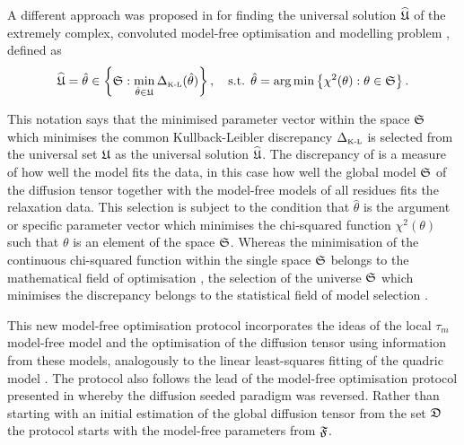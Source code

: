 \begin{htmlonly}
\begin{htmlonly}
A different approach was proposed in \citet{dAuvergneGooley08b} for finding the universal solution $\widehat{\mathfrak{U}}$ of the extremely complex, convoluted model-free optimisation and modelling problem \citep{dAuvergneGooley07}, defined as
\begin{equation} \label{eq: universal solution}
 \widehat{\mathfrak{U}} = \hat\theta \in \left\{ \mathfrak{S}: \min_{\hat\theta \in \mathfrak{U}} \Delta_{\scriptscriptstyle \text{K-L}}(\hat\theta) \right\},
  \text{\quad s.t. }
  \hat\theta = \arg \min \left\{\chi^2(\theta): \theta \in \mathfrak{S} \right\}.
\end{equation}

\noindent This notation says that the minimised parameter vector within the space $\mathfrak{S}$ which minimises the common Kullback-Leibler discrepancy $\Delta_{\scriptscriptstyle \text{K-L}}$ is selected from the universal set $\mathfrak{U}$ as the universal solution $\widehat{\mathfrak{U}}$.  The discrepancy of \citet{KullbackLeibler51} is a measure of how well the model fits the data, in this case how well the global model $\mathfrak{S}$ of the diffusion tensor together with the model-free models of all residues fits the relaxation data.  This selection is subject to the condition that $\hat\theta$ is the argument or specific parameter vector which minimises the chi-squared function $\chi^2(\theta)$ such that $\theta$ is an element of the space $\mathfrak{S}$.  Whereas the minimisation of the continuous chi-squared function within the single space $\mathfrak{S}$ belongs to the mathematical field of optimisation \citep{NocedalWright99}, the selection of the universe $\mathfrak{S}$ which minimises the discrepancy belongs to the statistical field of model selection \citep{Akaike73,Schwarz78,LinhartZucchini86,Zucchini00,dAuvergneGooley03}.

This new model-free optimisation protocol incorporates the ideas of the local $\tau_m$ model-free model \citep{Barbato92, Schurr94} and the optimisation of the diffusion tensor using information from these models, analogously to the linear least-squares fitting of the quadric model \citep{Bruschweiler95, Lee97}.  The protocol also follows the lead of the model-free optimisation protocol presented in \citet{Butterwick04} whereby the diffusion seeded paradigm was reversed.  Rather than starting with an initial estimation of the global diffusion tensor from the set $\mathfrak{D}$ the protocol starts with the model-free parameters from $\mathfrak{F}$.


\end{htmlonly}
\end{htmlonly}
